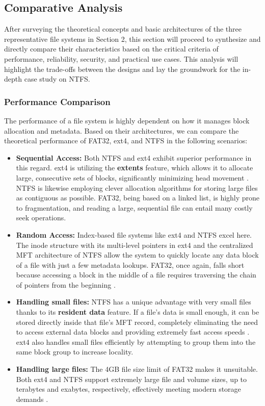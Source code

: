 \documentclass[12pt]{article}
\begin{document}
\subsection{Comparative Analysis}
After surveying the theoretical concepts and basic architectures of the three representative file systems in Section 2, this section will proceed to synthesize and directly compare their characteristics based on the critical criteria of performance, reliability, security, and practical use cases. This analysis will highlight the trade-offs between the designs and lay the groundwork for the in-depth case study on NTFS.

\subsubsection{Performance Comparison}
The performance of a file system is highly dependent on how it manages block allocation and metadata. Based on their architectures, we can compare the theoretical performance of FAT32, ext4, and NTFS in the following scenarios:

\begin{itemize}
    \item \textbf{Sequential Access:} Both NTFS and ext4 exhibit superior performance in this regard. ext4 is utilizing the \textbf{extents} feature, which allows it to allocate large, consecutive sets of blocks, significantly minimizing head movement \parencite{Dhjaku2019}. NTFS is likewise employing clever allocation algorithms for storing large files as contiguous as possible. FAT32, being based on a linked list, is highly prone to fragmentation, and reading a large, sequential file can entail many costly seek operations.

    \item \textbf{Random Access:} Index-based file systems like ext4 and NTFS excel here. The inode structure with its multi-level pointers in ext4 and the centralized MFT architecture of NTFS allow the system to quickly locate any data block of a file with just a few metadata lookups. FAT32, once again, falls short because accessing a block in the middle of a file requires traversing the chain of pointers from the beginning \parencite{Silberschatz2018}.

    \item \textbf{Handling small files:} NTFS has a unique advantage with very small files thanks to its \textbf{resident data} feature. If a file's data is small enough, it can be stored directly inside that file's MFT record, completely eliminating the need to access external data blocks and providing extremely fast access speeds \parencite{Tanenbaum2014}. ext4 also handles small files efficiently by attempting to group them into the same block group to increase locality.

    \item \textbf{Handling large files:} The 4GB file size limit of FAT32 makes it unsuitable. Both ext4 and NTFS support extremely large file and volume sizes, up to terabytes and exabytes, respectively, effectively meeting modern storage demands \parencite{Dhjaku2019}.
\end{itemize}
\end{document}
